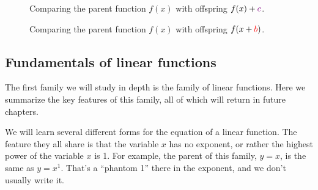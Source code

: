 \begin{figure}
\begin{minipage}{0.32\linewidth}
	\centering
\end{minipage}
%
\begin{minipage}{0.32\linewidth}
	\centering
\end{minipage}
%
\begin{minipage}{0.32\linewidth}
	\centering
\end{minipage}
\caption{Comparing the parent function $f(x)$ with offspring $f(x)+{\color{violet}c}$.}
\label{fig:transc}
\end{figure}

\begin{figure}
\begin{minipage}{0.32\linewidth}
	\centering
\end{minipage}
%
\begin{minipage}{0.32\linewidth}
	\centering
\end{minipage}
%
\begin{minipage}{0.32\linewidth}
	\centering
\end{minipage}
\caption{Comparing the parent function $f(x)$ with offspring $f(x+{\color{red}b})$.}
\label{fig:transb}
\end{figure}


\subsection{Fundamentals of linear functions}

The first family we will study in depth is the family of linear functions. Here we summarize the key features of this family, all of which will return in future chapters.

We will learn several different forms for the equation of a linear function. The feature they all share is that the variable $x$ has no exponent, or rather the highest power of the variable $x$ is 1. For example, the parent of this family, $y = x$, is the same as $y = x^1$. That's a ``phantom 1'' there in the exponent, and we don't usually write it.

